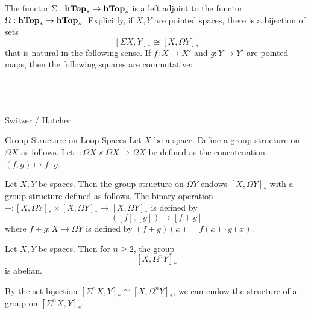 \documentclass[a4paper]{article}
\begin{document}
\begin{thm}{}{} The functor $\Sigma:\bold{hTop}_\ast\to\bold{hTop}_\ast$ is a left adjoint to the functor $\Omega:\bold{hTop}_\ast\to\bold{hTop}_\ast$. Explicitly, if $X,Y$ are pointed spaces, there is a bijection of sets $$[\Sigma X,Y]_\ast\cong[X,\Omega Y]_\ast$$ that is natural in the following sense. If $f:X\to X'$ and $g:Y\to Y'$ are pointed maps, then the following squares are commutative: \\~\\
\\~\\
\end{thm}

Switzer / Hatcher

\begin{defn}{Group Structure on Loop Spaces}{} Let $X$ be a space. Define a group structure on $\Omega X$ as follows. Let $\cdot:\Omega X\times\Omega X\to\Omega X$ be defined as the concatenation: $(f,g)\mapsto f\cdot g$. 
\end{defn}

\begin{prp}{}{} Let $X,Y$ be spaces. Then the group structure on $\Omega Y$ endows $[X,\Omega Y]_\ast$ with a group structure defined as follows. The binary operation $+:[X,\Omega Y]_\ast\times[X,\Omega Y]_\ast\to[X,\Omega Y]_\ast$ is defined by $$([f],[g])\mapsto[f+g]$$ where $f+g:X\to\Omega Y$ is defined by $(f+g)(x)=f(x)\cdot g(x)$. 
\end{prp}

\begin{prp}{}{} Let $X,Y$ be spaces. Then for $n\geq 2$, the group $$[X,\Omega^n Y]_\ast$$ is abelian. 
\end{prp}

By the set bijection $[\Sigma^nX,Y]_\ast\cong[X,\Omega^nY]_\ast$, we can endow the structure of a group on $[\Sigma^nX,Y]_\ast$. 
\end{document}
